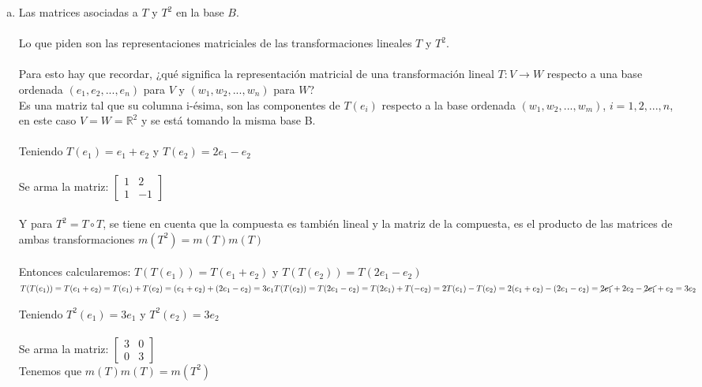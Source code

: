 \documentclass{article}
\begin{document}
\begin{enumerate}[a.]
	\item
		Las matrices asociadas a $T$ y $T^2$ en la base $B$. \\ \\
		Lo que piden son las representaciones matriciales de las transformaciones lineales $T$ y $T^2$. \\
		\\
		Para esto hay que recordar, ¿qué significa la representación matricial de una transformación lineal
		$T: V \rightarrow W$ respecto a una base ordenada $(e_1,e_2,...,e_n)$ para $V$ y $(w_1,w_2,...,w_n)$
		para $W$? \\
		Es una matriz tal que su columna i-ésima, son las componentes de $T(e_i)$ respecto a la 
		base ordenada $(w_1,w_2,...,w_m)$, $i=1,2,...,n$, en este caso $V=W=\mathbb{R}^2$ y se está tomando
		la misma base B. \\ \\
		Teniendo $T(e_1) = e_1+e_2$ y $T(e_2) = 2e_1-e_2$ \\ \\
		Se arma la matriz: $\begin{bmatrix} 1 & 2 \\ 1 & -1 \end{bmatrix}$
		\\
		\\
		Y para $T^2 = T \circ T$, se tiene en cuenta que la compuesta es también lineal y la matriz de la compuesta,
		es el producto de las matrices de ambas transformaciones $m(T^2) = m(T)m(T)$ \\ \\
		Entonces calcularemos: $T(T(e_1)) = T (e_1+e_2)$ y $T(T(e_2)) = T(2e_1-e_2)$ \\
		$T(T(e_1)) = T(e_1+e_2) = T(e_1) + T(e_2) = (e_1+e_2) + (2e_1 -e_2) = 3e_1\\
		T(T(e_2)) = T(2e_1-e_2) = T(2e_1) + T(-e_2) = 2T(e_1) - T(e_2) = 2(e_1+e_2) - (2e_1-e_2) =
		\cancel{2e_1} + 2e_2 - \cancel{2e_1} + e_2 = 3e_2$

		Teniendo $T^2(e_1) = 3e_1$ y $T^2(e_2) = 3e_2$ \\ \\
		Se arma la matriz: $\begin{bmatrix} 3 & 0 \\ 0 & 3 \end{bmatrix}$ \\
		Tenemos que $m(T)m(T) = m(T^2)$


\end{enumerate}
\end{document}
